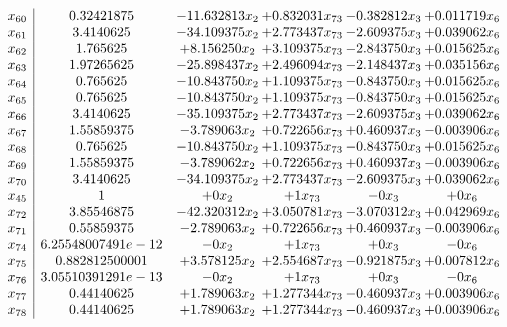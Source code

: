 \documentclass[11pt]{article}
\begin{document}
\[\begin{array}{c| c c@{\hskip 2pt} c@{\hskip 2pt} c@{\hskip 2pt} c@{\hskip 2pt} }
 x_{60}   &  0.32421875 & -11.632813 x_{2} & + 0.832031 x_{73} & -0.382812 x_{3} & + 0.011719 x_{6}\\
 x_{61}   &  3.4140625 & -34.109375 x_{2} & + 2.773437 x_{73} & -2.609375 x_{3} & + 0.039062 x_{6}\\
 x_{62}   &  1.765625 & + 8.156250 x_{2} & + 3.109375 x_{73} & -2.843750 x_{3} & + 0.015625 x_{6}\\
 x_{63}   &  1.97265625 & -25.898437 x_{2} & + 2.496094 x_{73} & -2.148437 x_{3} & + 0.035156 x_{6}\\
 x_{64}   &  0.765625 & -10.843750 x_{2} & + 1.109375 x_{73} & -0.843750 x_{3} & + 0.015625 x_{6}\\
 x_{65}   &  0.765625 & -10.843750 x_{2} & + 1.109375 x_{73} & -0.843750 x_{3} & + 0.015625 x_{6}\\
 x_{66}   &  3.4140625 & -35.109375 x_{2} & + 2.773437 x_{73} & -2.609375 x_{3} & + 0.039062 x_{6}\\
 x_{67}   &  1.55859375 & -3.789063 x_{2} & + 0.722656 x_{73} & + 0.460937 x_{3} & -0.003906 x_{6}\\
 x_{68}   &  0.765625 & -10.843750 x_{2} & + 1.109375 x_{73} & -0.843750 x_{3} & + 0.015625 x_{6}\\
 x_{69}   &  1.55859375 & -3.789062 x_{2} & + 0.722656 x_{73} & + 0.460937 x_{3} & -0.003906 x_{6}\\
 x_{70}   &  3.4140625 & -34.109375 x_{2} & + 2.773437 x_{73} & -2.609375 x_{3} & + 0.039062 x_{6}\\
 x_{45}   &  1 & + 0 x_{2} & + 1 x_{73} & -0 x_{3} & + 0 x_{6}\\
 x_{72}   &  3.85546875 & -42.320312 x_{2} & + 3.050781 x_{73} & -3.070312 x_{3} & + 0.042969 x_{6}\\
 x_{71}   &  0.55859375 & -2.789063 x_{2} & + 0.722656 x_{73} & + 0.460937 x_{3} & -0.003906 x_{6}\\
 x_{74}   &  6.25548007491e-12 & -0 x_{2} & + 1 x_{73} & + 0 x_{3} & -0 x_{6}\\
 x_{75}   &  0.882812500001 & + 3.578125 x_{2} & + 2.554687 x_{73} & -0.921875 x_{3} & + 0.007812 x_{6}\\
 x_{76}   &  3.05510391291e-13 & -0 x_{2} & + 1 x_{73} & + 0 x_{3} & -0 x_{6}\\
 x_{77}   &  0.44140625 & + 1.789063 x_{2} & + 1.277344 x_{73} & -0.460937 x_{3} & + 0.003906 x_{6}\\
 x_{78}   &  0.44140625 & + 1.789063 x_{2} & + 1.277344 x_{73} & -0.460937 x_{3} & + 0.003906 x_{6}\\

\end{array}\]
\end{document}
